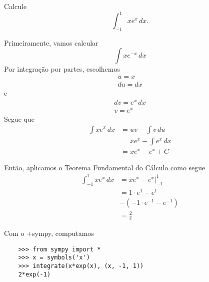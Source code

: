 \begin{exeresol}
  Calcule
  \begin{equation}
    \int_{-1}^1 xe^x\,dx.
  \end{equation}
\end{exeresol}
\begin{resol}
  Primeiramente, vamos calcular
  \begin{equation}
    \int xe^{-x}\,dx
  \end{equation}
  Por integração por partes, escolhemos
  \begin{gather}
    u = x\\
    du = dx
  \end{gather}
  e
  \begin{gather}
    dv = e^x\,dx\\
    v = e^x
  \end{gather}
  Segue que
  \begin{align}
    \int xe^x\,dx &= uv - \int v\,du\\
                  &= xe^x - \int e^x\,dx\\
                  &= xe^x - e^x + C
  \end{align}

  Então, aplicamos o Teorema Fundamental do Cálculo como segue
  \begin{align}
    \int_{-1}^1 xe^x\,dx &= \left. xe^x - e^x\right|_{-1}^1\\
                         &= 1\cdot e^1 - e^1\\
                         &- (-1\cdot e^{-1} - e^{-1})\\
                         &= \frac{2}{e}
  \end{align}
  
  \ifispython
  Com o {\python}+{sympy}, computamos
  \begin{lstlisting}
    >>> from sympy import *
    >>> x = symbols('x')
    >>> integrate(x*exp(x), (x, -1, 1))
    2*exp(-1)
  \end{lstlisting}
  \fi
\end{resol}

